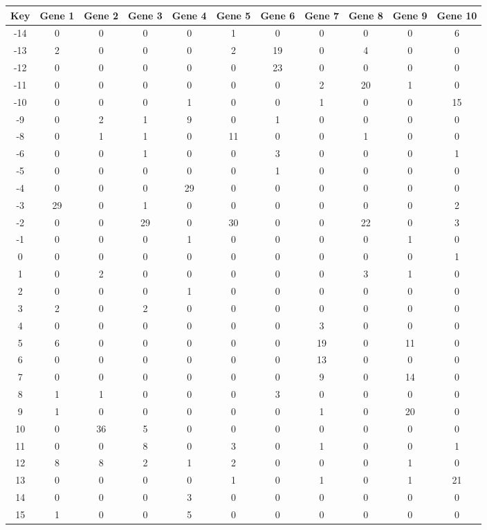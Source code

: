 \begin{tabular}{|c|c|c|c|c|c|c|c|c|c|c|}
\hline
Key & Gene 1 & Gene 2 & Gene 3 & Gene 4 & Gene 5 & Gene 6 & Gene 7 & Gene 8 & Gene 9 & Gene 10 \\
\hline
-14 & 0 & 0 & 0 & 0 & 1 & 0 & 0 & 0 & 0 & 6 \\
-13 & 2 & 0 & 0 & 0 & 2 & 19 & 0 & 4 & 0 & 0 \\
-12 & 0 & 0 & 0 & 0 & 0 & 23 & 0 & 0 & 0 & 0 \\
-11 & 0 & 0 & 0 & 0 & 0 & 0 & 2 & 20 & 1 & 0 \\
-10 & 0 & 0 & 0 & 1 & 0 & 0 & 1 & 0 & 0 & 15 \\
-9 & 0 & 2 & 1 & 9 & 0 & 1 & 0 & 0 & 0 & 0 \\
-8 & 0 & 1 & 1 & 0 & 11 & 0 & 0 & 1 & 0 & 0 \\
-6 & 0 & 0 & 1 & 0 & 0 & 3 & 0 & 0 & 0 & 1 \\
-5 & 0 & 0 & 0 & 0 & 0 & 1 & 0 & 0 & 0 & 0 \\
-4 & 0 & 0 & 0 & 29 & 0 & 0 & 0 & 0 & 0 & 0 \\
-3 & 29 & 0 & 1 & 0 & 0 & 0 & 0 & 0 & 0 & 2 \\
-2 & 0 & 0 & 29 & 0 & 30 & 0 & 0 & 22 & 0 & 3 \\
-1 & 0 & 0 & 0 & 1 & 0 & 0 & 0 & 0 & 1 & 0 \\
0 & 0 & 0 & 0 & 0 & 0 & 0 & 0 & 0 & 0 & 1 \\
1 & 0 & 2 & 0 & 0 & 0 & 0 & 0 & 3 & 1 & 0 \\
2 & 0 & 0 & 0 & 1 & 0 & 0 & 0 & 0 & 0 & 0 \\
3 & 2 & 0 & 2 & 0 & 0 & 0 & 0 & 0 & 0 & 0 \\
4 & 0 & 0 & 0 & 0 & 0 & 0 & 3 & 0 & 0 & 0 \\
5 & 6 & 0 & 0 & 0 & 0 & 0 & 19 & 0 & 11 & 0 \\
6 & 0 & 0 & 0 & 0 & 0 & 0 & 13 & 0 & 0 & 0 \\
7 & 0 & 0 & 0 & 0 & 0 & 0 & 9 & 0 & 14 & 0 \\
8 & 1 & 1 & 0 & 0 & 0 & 3 & 0 & 0 & 0 & 0 \\
9 & 1 & 0 & 0 & 0 & 0 & 0 & 1 & 0 & 20 & 0 \\
10 & 0 & 36 & 5 & 0 & 0 & 0 & 0 & 0 & 0 & 0 \\
11 & 0 & 0 & 8 & 0 & 3 & 0 & 1 & 0 & 0 & 1 \\
12 & 8 & 8 & 2 & 1 & 2 & 0 & 0 & 0 & 1 & 0 \\
13 & 0 & 0 & 0 & 0 & 1 & 0 & 1 & 0 & 1 & 21 \\
14 & 0 & 0 & 0 & 3 & 0 & 0 & 0 & 0 & 0 & 0 \\
15 & 1 & 0 & 0 & 5 & 0 & 0 & 0 & 0 & 0 & 0 \\
\hline
\end{tabular}